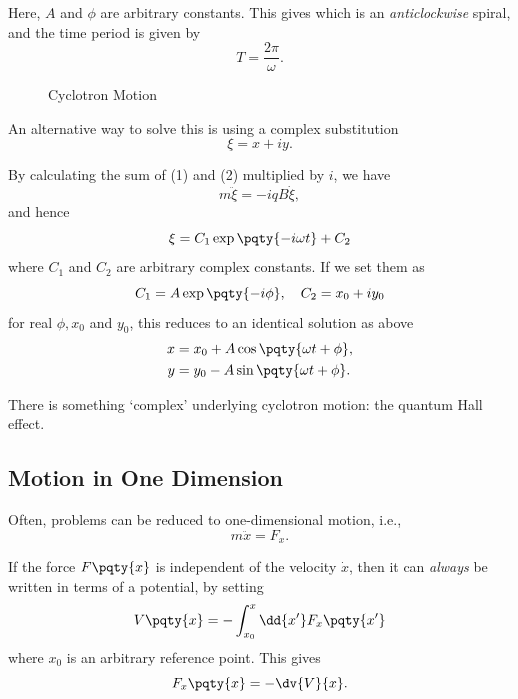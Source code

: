 Here, \(A\) and \(\phi\) are arbitrary constants. This gives  which is an \emph{anticlockwise} spiral, and the time period is given by
\begin{equation}
    T = \frac{2\pi}{\omega}.
\end{equation}

\begin{figure}[ht!]
    \centering

    \caption{Cyclotron Motion}
    \label{fig:cyclotron-motion}%
\end{figure}

An alternative way to solve this is using a complex substitution
\begin{equation}
    \xi = x + iy.
\end{equation}

By calculating the sum of (1) and (2) multiplied by \(i\), we have
\begin{equation}
    m \ddot{\xi} = - i q B \dot{\xi},
\end{equation}
and hence
\begin{equation}
    \xi = C_1 \exp\pqty{- i \omega t} + C_2
\end{equation}
where \(C_1\) and \(C_2\) are arbitrary complex constants. If we set them as
\begin{equation}
    C_1 = A \exp\pqty{- i \phi}, \quad C_2 = x_0 + i y_0
\end{equation}
for real \(\phi, x_0\) and \(y_0\), this reduces to an identical solution as above
\begin{subequations}\begin{align}
    x &= x_0 + A \cos \pqty{\omega t + \phi}, \\
    y &= y_0 - A \sin \pqty{\omega t + \phi}.
\end{align}\end{subequations}

There is something `complex' underlying cyclotron motion: the quantum Hall effect.

\subsection{Motion in One Dimension}

Often, problems can be reduced to one-dimensional motion, i.e.,
\begin{equation}
    m \ddot{x} = F_x.
\end{equation}

If the force \(F\pqty{x}\) is independent of the velocity \(\dot{x}\), then it can \emph{always} be written in terms of a potential, by setting
\begin{equation}
    V\pqty{x} = - \int_{x_0}^{x} \dd{x'} F_x \pqty{x'}
\end{equation}
where \(x_0\) is an arbitrary reference point. This gives
\begin{equation}
    F_x \pqty{x} = - \dv{V}{x}.
\end{equation}

